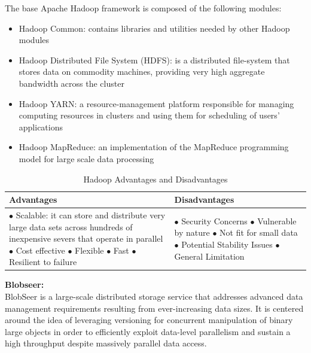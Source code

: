 The base Apache Hadoop framework is composed of the following modules:
\begin{itemize}
\item Hadoop Common: contains libraries and utilities needed by other Hadoop modules
\item Hadoop Distributed File System (HDFS): is a distributed file-system that stores data on commodity machines, providing very high aggregate bandwidth across the cluster
\item Hadoop YARN: a resource-management platform responsible for managing computing resources in clusters and using them for scheduling of users' applications
\item Hadoop MapReduce: an implementation of the MapReduce programming model for large scale data processing
\end{itemize}




\begin{table}[H]
\caption{Hadoop Advantages and Disadvantages}
\begin{center}
\begin{tabularx}{17cm}{ |p{8.5cm}|X| } 
 \hline
\textbf{Advantages} & \textbf{Disadvantages } \\ \hline
 $\bullet$ Scalable: it can store and distribute very large data sets across hundreds of inexpensive severs that operate in parallel \newline $\bullet$ Cost effective \newline $\bullet$ Flexible \newline $\bullet$ Fast \newline $\bullet$ Resilient to failure & $\bullet$ Security Concerns \newline $\bullet$ Vulnerable by nature \newline $\bullet$ Not fit for small data \newline $\bullet$ Potential Stability Issues \newline $\bullet$ General Limitation  \\ \hline

\end{tabularx}
\end{center}
\end{table}
\textbf{\normalsize{Blobseer:}}\\

BlobSeer is a large-scale distributed storage service that addresses advanced data management requirements resulting from ever-increasing data sizes. It is centered around the idea of leveraging versioning for concurrent manipulation of binary large objects in order to efficiently exploit data-level parallelism and sustain a high throughput despite massively parallel data access.\\



